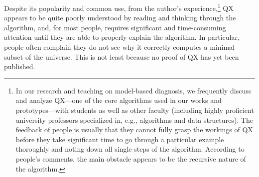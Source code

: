 \documentclass[]{elsarticle}
\begin{document}
	Despite its popularity and common use, from the author's experience,\footnote{
		In our research and teaching on model-based diagnosis, we frequently discuss and analyze QX---one of the core algorithms used in our works and prototypes---with students as well as other faculty (including highly proficient university professors specialized in, e.g., algorithms and data structures). The feedback of people is usually that they cannot fully grasp the workings of QX before they take significant time to go through a particular example thoroughly and noting down all single steps of the algorithm. According to people's comments, the main obstacle appears to be the recursive nature of the algorithm.
	}
	QX appears to be quite poorly understood by reading and thinking through the algorithm, and, for most people, requires significant and time-consuming attention until they are able to properly explain the algorithm.
	In particular, people often complain they do not see why it correctly computes a minimal subset of the universe. This is not least because no proof of QX has yet been published. 
	
\end{document}
